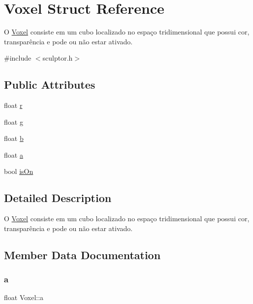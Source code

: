 \hypertarget{struct_voxel}{}\section{Voxel Struct Reference}
\label{struct_voxel}


O \hyperlink{struct_voxel}{Voxel} consiste em um cubo localizado no espaço tridimensional que possui cor, transparência e pode ou não estar ativado.  




{\ttfamily \#include $<$sculptor.\+h$>$}

\subsection*{Public Attributes}
\begin{DoxyCompactItemize}
\item 
float \hyperlink{struct_voxel_a06872ec79b836120b551a848968c0f1b}{r}
\item 
float \hyperlink{struct_voxel_a27c0da1ed2ff430401d23ff171612a73}{g}
\item 
float \hyperlink{struct_voxel_a5cd8432b1d7d0fd8b79e0fc7d10373a8}{b}
\item 
float \hyperlink{struct_voxel_a3ce2579eb0a9f09a07112ce7498a638e}{a}
\item 
bool \hyperlink{struct_voxel_a6fbe8bd53f64685ac4210726d40fc775}{is\+On}
\end{DoxyCompactItemize}


\subsection{Detailed Description}
O \hyperlink{struct_voxel}{Voxel} consiste em um cubo localizado no espaço tridimensional que possui cor, transparência e pode ou não estar ativado. 

\subsection{Member Data Documentation}
\mbox{\label{struct_voxel_a3ce2579eb0a9f09a07112ce7498a638e}} 
\subsubsection{\texorpdfstring{a}{a}}
{\footnotesize\ttfamily float Voxel\+::a}

